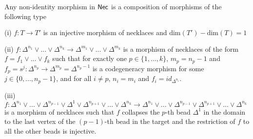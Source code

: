 \begin{proposition}\label{Necmorphs} Any non-identity morphism in $\mathsf{Nec}$ is a composition of morphisms of the following type
\begin{item}
\item (i)  $f: T \to T'$ is an injective morphism of necklaces and $ \text{dim}(T')- \text{dim}(T)=1$
\\
\item (ii) $f: \Delta^{n_1} \vee ... \vee \Delta^{n_k} \to \Delta^{m_1} \vee ... \vee \Delta^{m_k}$ is a morphism of necklaces of the form $f=f_1 \vee ... \vee f_k$ such that for exactly one $p \in \{1,...,k\}$, $m_p=n_p-1$ and $f_p= s^j: \Delta^{n_p} \to \Delta^{m_p}= \Delta^{n_p-1}$ is a codegeneracy morphism for some $j \in \{0,...,n_p-1\}$, and for all $i \neq p$, $n_i=m_i$ and $f_i=id_{\Delta^{n_i}}$. 
\\
\item (iii) $f: \Delta^{n_1} \vee ...\vee \Delta^{n_{p-1}} \vee \Delta^1 \vee \Delta^{n_{p+1}} \vee... \vee  \Delta^{n_k} \to \Delta^{n_1} \vee ...\vee \Delta^{n_{p-1}} \vee \Delta^{n_{p+1}} \vee... \vee  \Delta^{n_k}$ is a morphism of necklaces such that $f$ collapses the $p$-th bead $\Delta^1$  in the domain to the last vertex of the $(p-1)$-th bead in the target and the restriction of $f$ to all the other beads is injective. 
\end{item}
\end{proposition}

